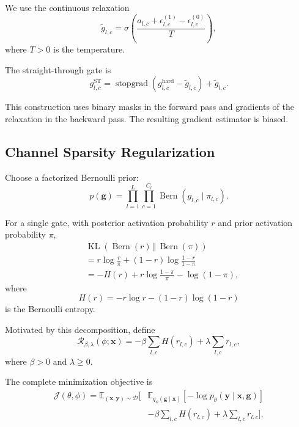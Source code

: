\documentclass[sigplan,screen]{acmart}
\begin{document}
We use the continuous relaxation
\begin{equation}
\widetilde{g}_{l,c}
=
\sigma\left(
\frac{
a_{l,c}
+
\epsilon^{(1)}_{l,c}
-
\epsilon^{(0)}_{l,c}
}{T}
\right),
\end{equation}
where $T>0$ is the temperature.

The straight-through gate is
\begin{equation}
g^{\mathrm{ST}}_{l,c}
=
\operatorname{stopgrad}
\left(
g^{\mathrm{hard}}_{l,c}
-
\widetilde{g}_{l,c}
\right)
+
\widetilde{g}_{l,c}.
\end{equation}

This construction uses binary masks in the forward pass
and gradients of the relaxation in the backward pass.
The resulting gradient estimator is biased.

\subsection{Channel Sparsity Regularization}

Choose a factorized Bernoulli prior:
\begin{equation}
p(\mathbf{g})
=
\prod_{l=1}^{L}\prod_{c=1}^{C_l}
\operatorname{Bern}(g_{l,c}\mid\pi_{l,c}).
\end{equation}

For a single gate, with posterior activation probability
$r$ and prior activation probability $\pi$,
\begin{equation}
\begin{split}
&\operatorname{KL}
\left(
\operatorname{Bern}(r)
\,\Vert\,
\operatorname{Bern}(\pi)
\right)
\\
&{}=r\log\frac{r}{\pi}
+
(1-r)\log\frac{1-r}{1-\pi}
\\
&{}=-H(r)
+
r\log\frac{1-\pi}{\pi}
-
\log(1-\pi),
\end{split}
\end{equation}
where
\begin{equation}
H(r)
=
-r\log r-(1-r)\log(1-r)
\end{equation}
is the Bernoulli entropy.

Motivated by this decomposition, define
\begin{equation}
\mathcal{R}_{\beta,\lambda}(\phi;\mathbf{x})
=
-\beta\sum_{l,c}H(r_{l,c})
+
\lambda\sum_{l,c}r_{l,c},
\end{equation}
where $\beta>0$ and $\lambda\geq0$.

The complete minimization objective is
\begin{equation}
\boxed{
\begin{aligned}
\mathcal{J}(\theta,\phi)
=
\mathbb{E}_{(\mathbf{x},\mathbf{y})\sim\mathcal{D}}
\Bigg[
&
\mathbb{E}_{q_\phi(\mathbf{g}\mid\mathbf{x})}
\left[
-\log p_\theta(\mathbf{y}\mid\mathbf{x},\mathbf{g})
\right]
\\
&-\beta\sum_{l,c}H(r_{l,c})
+\lambda\sum_{l,c}r_{l,c}
\Bigg].
\end{aligned}
}
\end{equation}
\end{document}
